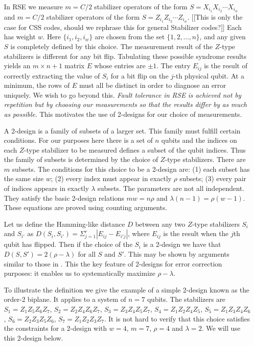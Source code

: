 \documentclass[reprint, superscriptaddress]{revtex4-1}
\numberwithin{equation}{section}
\numberwithin{figure}{section}
\numberwithin{table}{section}
\begin{document}
In RSE we measure $m=C/2$ stabilizer operators of the form 
$S = X_{i_1} X_{i_2} \cdots X_{i_w}$
and $m=C/2$ stabilizer operators of the form
$S = Z_{i_1} Z_{i_2} \cdots Z_{i_w}$. [[This is only the case for CSS codes, should we rephrase this for general Stabilizer codes?]] Each has weight $w$. Here $\{i_1, i_2, i_w\}$ are chosen from the set $\{1,2,\dots,n\}$, and any given $S$ is completely defined by this choice.  The measurement result of the $Z$-type stabilizers is different for any bit flip.  Tabulating these possible syndrome results yields an $m \times n+1 $ matrix $E$ whose entries are $\pm 1$.  The entry $E_{ij}$ is the result of correctly extracting the value of $S_i$ for a bit flip on the $j$-th physical qubit.  At a minimum, the rows of $E$ must all be distinct in order to diagnose an error uniquely.  We wish to go beyond this.  \textit{Fault tolerance in RSE is achieved not by repetition but by choosing our measurements so that the results differ by as much as possible.} This motivates the use of 2-designs for our choice of measurements.

A 2-design is a family of subsets of a larger set.  This family must fulfill certain conditions.  For our purposes here there is a set of $n$ qubits and the indices on each $Z$-type stabilizer to be measured defines a subset of the qubit indices.  Thus the family of subsets is determined by the choice of $Z$-type stabilizers.  There are $m$ subsets.  The conditions for this choice to be a 2-design are: (1) each subset has the same size $w$; (2) every index must appear in exactly $\rho$ subsets; (3) every pair of indices appears in exactly $\lambda$ subsets.  The parameters are not all independent.  They satisfy the basic 2-design relations $mw=n \rho$ and $\lambda (n-1) = \rho (w-1)$.  These equations are proved using counting arguments.  

 Let us define the Hamming-like distance $D$ between any two $Z$-type stabilizers $S_{i}$ and $S_{i'}$ as $D(S_{i},S_{i'}) = \Sigma_{j=1}^{r} |E_{ij}-E_{i'j}|$, where $E_{ij}$ is the result when the $j$th qubit has flipped.  Then if the choice of the $S_i$ is a 2-design we have that $D(S,S') =2(\rho-\lambda)$ for all $S$ and $S'$.  This may be shown by arguments similar to those in \cite{Pless}.  This the key feature of 2-designs for error correction purposes: it enables us to systematically maximize $\rho - \lambda $. 

To illustrate the definition we give the example of a simple 2-design known as the order-2 biplane.  It applies to a system of $n=7$ qubits.  The stabilizers are $S_1 = Z_1 Z_5 Z_6 Z_7$, $S_2 = Z_2 Z_4 Z_6 Z_7$, $S_3 = Z_3 Z_4 Z_5 Z_7$, $S_4 = Z_1 Z_2 Z_4 Z_5$, $S_5 = Z_1 Z_3 Z_4 Z_6$, $S_6 = Z_2 Z_3 Z_5 Z_6$, $S_7 = Z_1 Z_2 Z_3 Z_7$.  It is not hard to verify that this choice satisfies the constraints for a 2-design with $w=4$, $m=7$, $\rho = 4$ and $\lambda = 2$.  We will use this 2-design below. 
\end{document}
